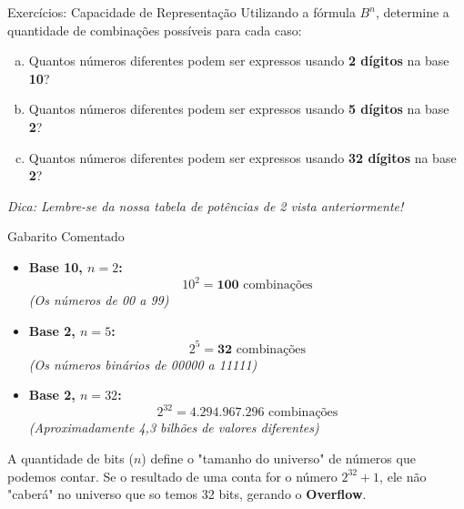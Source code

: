\begin{frame}{Exercícios: Capacidade de Representação}
    Utilizando a fórmula $B^n$, determine a quantidade de combinações possíveis para cada caso:


    \begin{enumerate}[a)]
        \item Quantos números diferentes podem ser expressos usando \textbf{2 dígitos} na base \textbf{10}?

              \vspace{0.4cm}

        \item Quantos números diferentes podem ser expressos usando \textbf{5 dígitos} na base \textbf{2}?

              \vspace{0.4cm}

        \item Quantos números diferentes podem ser expressos usando \textbf{32 dígitos} na base \textbf{2}?
    \end{enumerate}


    \vspace{0.6cm}
    \begin{center}
        \textit{Dica: Lembre-se da nossa tabela de potências de 2 vista anteriormente!}
    \end{center}
\end{frame}

\begin{frame}{Gabarito Comentado}
    \begin{itemize}
        \item[\textbf{a)}] \textbf{Base 10, $n=2$:}
              $$ 10^2 = \mathbf{100} \text{ combinações} $$
              \textit{(Os números de 00 a 99)}

              \vspace{0.3cm}

        \item[\textbf{b)}] \textbf{Base 2, $n=5$:}
              $$ 2^5 = \mathbf{32} \text{ combinações} $$
              \textit{(Os números binários de 00000 a 11111)}

              \vspace{0.3cm}

        \item[\textbf{c)}] \textbf{Base 2, $n=32$:}
              $$ 2^{32} = \mathbf{4.294.967.296} \text{ combinações} $$
              \textit{(Aproximadamente 4,3 bilhões de valores diferentes)}
    \end{itemize}


    A quantidade de bits ($n$) define o "tamanho do universo" de números que podemos contar. Se o resultado de uma conta for o número $2^{32} + 1$, ele não "caberá" no universo que so temos 32 bits, gerando o \textbf{Overflow}.

\end{frame}

